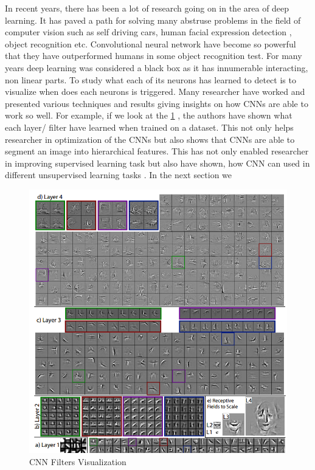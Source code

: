 
\doublespacing
{}
   
In recent years, there has been a lot of research going on in the area of deep learning. It has paved a path for solving many abstruse problems in the field of computer vision such as self driving cars, human facial expression detection \cite{1612.02903}, object recognition etc. Convolutional neural network have become so powerful that they have outperformed humans in some object recognition \cite{CNN-Better,krizhevsky2012imagenet,szegedy2015going,he2016deep,simonyan2014very} test. For many years deep learning was considered a black box as it has innumerable interacting, non linear parts. To study what each of its neurons has learned to detect is to visualize when does each neurons is triggered.  
Many researcher have worked and presented various techniques and results giving insights on how CNNs are able to work so well. For example, if we look at the \cref{fig:visualize-cnn} , the authors \cite{zeiler2011adaptive} have shown what each layer/ filter  have learned when trained on a dataset. This not only helps researcher in optimization of the CNNs but also shows that CNNs are able to segment an image into hierarchical features. This has not only enabled researcher in improving supervised learning task but also have shown, how CNN can used  in different unsupervised learning tasks \cite{1506.06579}. In the next section we  
\begin{figure}[H]
  \centering
    \includegraphics[scale=.5, angle=0]{Files/cnn-visualize.png}
    \caption[CNN Filters Visualizations]{CNN Filters Visualization \cite{zeiler2011adaptive}}
    \label{fig:visualize-cnn}
\end{figure}

